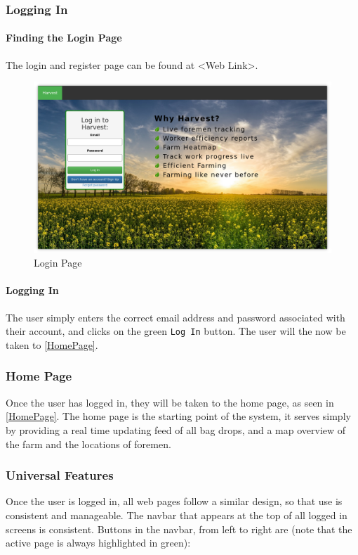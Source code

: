 \documentclass[11pt]{article}
\begin{document}
\subsubsection{Logging In}
\paragraph{Finding the Login Page}The login and register page can be found at <Web Link>.

\begin{figure}
 \centering
 \includegraphics[width=12cm, keepaspectratio]{Images/Login-Page.png}
 \caption{Login Page}
 \label{LoginPage}
\end{figure}

\paragraph{Logging In}The user simply enters the correct email address and password associated with their account, and clicks on the green \texttt{Log In} button. The user will the now be taken to \ref{HomePage}.

\subsubsection{Home Page}
Once the user has logged in, they will be taken to the home page, as seen in \ref{HomePage}. The home page is the starting point of the system, it serves simply by providing a real time updating feed of all bag drops, and a map overview of the farm and the locations of foremen.

\subsubsection{Universal Features}
Once the user is logged in, all web pages follow a similar design, so that use is consistent and manageable. The navbar that appears at the top of all logged in screens is consistent. Buttons in the navbar, from left to right are (note that the active page is always highlighted in green): 
\end{document}
